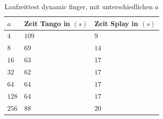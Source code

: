 \documentclass[a4paper,12pt]{article}
\begin{document}
\begin{table}[H]
	\begin{center}
		\begin{tabular}[c]{|l|l|l|}
			\hline
			$a$ & Zeit Tango in $\left(s\right)$ &Zeit Splay in $\left(s\right)$ \\
			\hline
			$4$ & $109$ &$9$ \\
			\hline
			$8$  & $69$ &$14$  \\
			\hline
			$16$  & $63$ &$17$  \\
			\hline
			$32$  & $62$ &$17$  \\
			\hline
			$64$  & $64$ &$17$  \\
			\hline
			$128$  & $64$ &$17$  \\
			\hline
			$256$  & $88$ &$20$  \\
			\hline
		\end{tabular}
		\caption{Laufzeittest dynamic finger, mit unterschiedlichen $a$} 
	\end{center}
\end{table}
\end{document}
